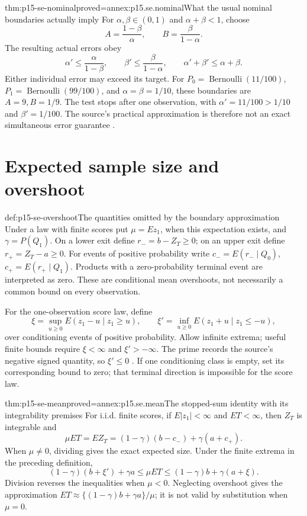 \begin{hbtheorem}{thm:p15-se-nominal}{proved=annex:p15.se.nominal}{What the usual nominal boundaries actually imply}
For \(\alpha,\beta\in(0,1)\) and \(\alpha+\beta<1\), choose
\[
 A=\frac{1-\beta}{\alpha},\qquad B=\frac{\beta}{1-\alpha}.
\]
The resulting actual errors obey
\[
 \alpha'\leq\frac{\alpha}{1-\beta},\qquad
 \beta'\leq\frac{\beta}{1-\alpha},\qquad
 \alpha'+\beta'\leq\alpha+\beta.
\]
Either individual error may exceed its target. For
\(P_0=\operatorname{Bernoulli}(11/100)\),
\(P_1=\operatorname{Bernoulli}(99/100)\), and
\(\alpha=\beta=1/10\), these boundaries are \(A=9,B=1/9\).
The test stops after one observation, with
\(\alpha'=11/100>1/10\) and \(\beta'=1/100\).
The source's practical approximation is therefore not an exact
simultaneous error guarantee
\cite[Section 3.3, equations (3.26)--(3.30)]{Wald1945SequentialTests}.
\end{hbtheorem}

\section{Expected sample size and overshoot}
\label{sec:p15-se-sample-size}

\begin{hbdefinition}{def:p15-se-overshoot}{The quantities omitted by the boundary approximation}
Under a law with finite scores put \(\mu=Ez_1\), when this
expectation exists, and \(\gamma=P(Q_1)\). On a lower exit define
\(r_-=b-Z_T\geq0\); on an upper exit define
\(r_+=Z_T-a\geq0\). For events of positive probability write
\(c_-=E(r_-\mid Q_0)\), \(c_+=E(r_+\mid Q_1)\).
Products with a zero-probability terminal event are interpreted as zero.
These are conditional mean overshoots, not necessarily a common bound
on every observation.

For the one-observation score law, define
\[
 \xi=\sup_{u\geq0}E(z_1-u\mid z_1\geq u),\qquad
 \xi'=\inf_{u\geq0}E(z_1+u\mid z_1\leq-u),
\]
over conditioning events of positive probability. Allow infinite
extrema; useful finite bounds require \(\xi<\infty\) and
\(\xi'>-\infty\). The prime records the source's negative signed
quantity, so \(\xi'\leq0\) \cite[Section 4.1]{Wald1945SequentialTests}.
If one conditioning class is empty, set its corresponding bound to
zero; that terminal direction is impossible for the score law.
\end{hbdefinition}

\begin{hbtheorem}{thm:p15-se-mean}{proved=annex:p15.se.mean}{The stopped-sum identity with its integrability premises}
For i.i.d. finite scores, if \(E|z_1|<\infty\) and \(ET<\infty\),
then \(Z_T\) is integrable and
\[
 \mu ET=EZ_T=(1-\gamma)(b-c_-)+\gamma(a+c_+).
\]
When \(\mu\ne0\), dividing gives the exact expected size. Under the
finite extrema in the preceding definition,
\[
 (1-\gamma)(b+\xi')+\gamma a
 \leq \mu ET
 \leq (1-\gamma)b+\gamma(a+\xi).
\]
Division reverses the inequalities when \(\mu<0\). Neglecting
overshoot gives the approximation
\(ET\approx\{(1-\gamma)b+\gamma a\}/\mu\); it is not valid
by substitution when \(\mu=0\).
\cite[Equations (4.4)--(4.14)]{Wald1945SequentialTests}
\end{hbtheorem}

